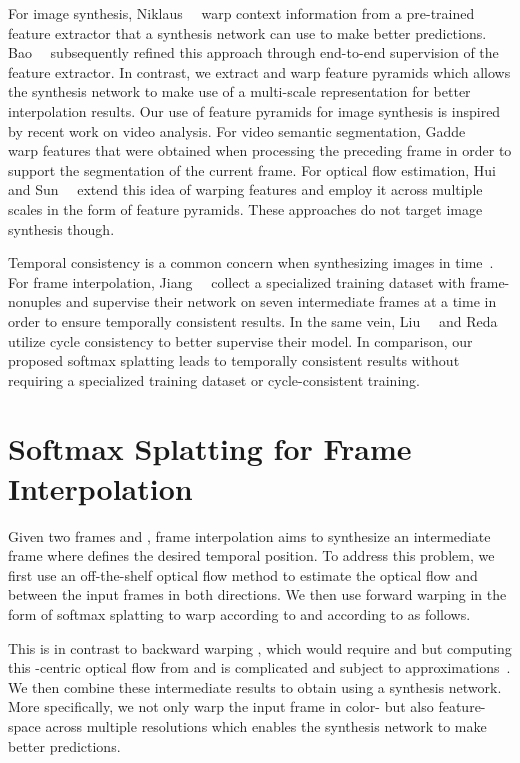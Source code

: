 \documentclass[10pt,twocolumn,letterpaper]{article}
\begin{document}
For image synthesis, Niklaus~\etal~\cite{Niklaus_CVPR_2018} warp context information from a pre-trained feature extractor that a synthesis network can use to make better predictions. Bao~\etal~\cite{Bao_CVPR_2019} subsequently refined this approach through end-to-end supervision of the feature extractor. In contrast, we extract and warp feature pyramids which allows the synthesis network to make use of a multi-scale representation for better interpolation results. Our use of feature pyramids for image synthesis is inspired by recent work on video analysis. For video semantic segmentation, Gadde~\etal~\cite{Gadde_ICCV_2017} warp features that were obtained when processing the preceding frame in order to support the segmentation of the current frame. For optical flow estimation, Hui~\etal~\cite{Hui_CVPR_2018} and Sun~\etal~\cite{Sun_CVPR_2018} extend this idea of warping features and employ it across multiple scales in the form of feature pyramids. These approaches do not target image synthesis though.

Temporal consistency is a common concern when synthesizing images in time~\cite{Aydin_TOG_2014, Huang_CVPR_2017, Huang_TOG_2016, Lai_ECCV_2018}. For frame interpolation, Jiang~\etal~\cite{Jiang_CVPR_2018} collect a specialized training dataset with frame-nonuples and supervise their network on seven intermediate frames at a time in order to ensure temporally consistent results. In the same vein, Liu~\etal~\cite{Liu_AAAI_2019} and Reda~\etal~\cite{Reda_ICCV_2019} utilize cycle consistency to better supervise their model. In comparison, our proposed softmax splatting leads to temporally consistent results without requiring a specialized training dataset or cycle-consistent training. 
\section{Softmax Splatting for Frame Interpolation}
\label{sec:method}
Given two frames  and , frame interpolation aims to synthesize an intermediate frame  where  defines the desired temporal position. To address this problem, we first use an off-the-shelf optical flow method to estimate the optical flow  and  between the input frames in both directions. We then use forward warping in the form of softmax splatting  to warp  according to  and  according to  as follows.

This is in contrast to backward warping , which would require  and  but computing this -centric optical flow from  and  is complicated and subject to approximations~\cite{Bao_CVPR_2019}. We then combine these intermediate results to obtain  using a synthesis network. More specifically, we not only warp the input frame in color- but also feature-space across multiple resolutions which enables the synthesis network to make better predictions.
\end{document}
